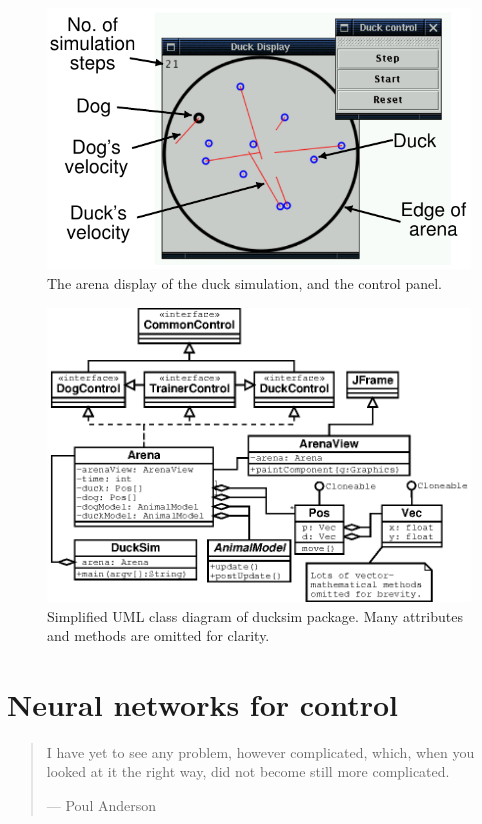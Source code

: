 \documentclass[a4paper]{report}
\newcommand{\code}[1]{{\ttfamily #1}}
\begin{document}
\begin{figure}[htb]
  \centerline{\includegraphics{figs/duck-ui.pdf}}
  \caption{\label{fig-ducksim-ui}
    The arena display of the duck simulation, and the control panel.}
\end{figure}

\begin{figure}[htb]
  \centerline{\includegraphics{figs/ducksim2.eps}}
  \caption{\label{fig-ducksim-uml}
    Simplified UML class diagram of \code{ducksim} package.
    Many attributes and methods are omitted for clarity.}
\end{figure}

\chapter{Neural networks for control}

\begin{quote}
  I have yet to see any problem, however complicated, which, when you
  looked at it the right way, did not become still more complicated.

  {\hspace{5cm}--- Poul Anderson}
\end{quote}
\end{document}
